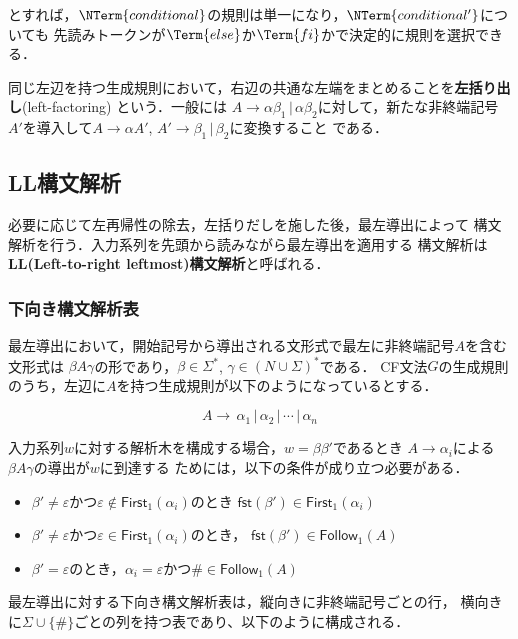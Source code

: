 \documentclass[a4j,dvipdfmx]{jbook}
\begin{document}
とすれば，$\NTerm{conditional}$の規則は単一になり，$\NTerm{conditional'}$についても
先読みトークンが$\Term{else}$か$\Term{fi}$かで決定的に規則を選択できる．

同じ左辺を持つ生成規則において，右辺の共通な左端をまとめることを{\bf 左括り出し}(left-factoring)
という．一般には $A\rightarrow \alpha\beta_1\,|\,\alpha\beta_2$に対して，新たな非終端記号
$A'$を導入して$A\rightarrow \alpha A'$, $A'\rightarrow\beta_1\,|\,\beta_2$に変換すること
である．

\subsection{LL構文解析}

必要に応じて左再帰性の除去，左括りだしを施した後，最左導出によって
構文解析を行う．入力系列を先頭から読みながら最左導出を適用する
構文解析は{\bf LL(Left-to-right leftmost)構文解析}と呼ばれる．

\subsubsection{下向き構文解析表}

最左導出において，開始記号から導出される文形式で最左に非終端記号$A$を含む文形式は
$\beta A\gamma$の形であり，$\beta\in\Sigma^\ast$, $\gamma\in(N\cup\Sigma)^\ast$である．
CF文法$G$の生成規則のうち，左辺に$A$を持つ生成規則が以下のようになっているとする．

\[A\rightarrow\,\alpha_1\,|\,\alpha_2\,|\,\cdots\,|\,\alpha_n\]

入力系列$w$に対する解析木を構成する場合，$w=\beta\beta'$であるとき
$A\rightarrow\alpha_i$による$\beta A\gamma$の導出が$w$に到達する
ためには，以下の条件が成り立つ必要がある．

\begin{itemize}
  \item $\beta'\not=\varepsilon$かつ$\varepsilon\notin\mathsf{First}_1(\alpha_i)$のとき
  $\mathsf{fst}(\beta')\in\mathsf{First}_1(\alpha_i)$ 
  \item $\beta'\not=\varepsilon$かつ$\varepsilon\in\mathsf{First}_1(\alpha_i)$のとき，
  $\mathsf{fst}(\beta')\in\mathsf{Follow}_1(A)$
  \item $\beta'=\varepsilon$のとき，$\alpha_i=\varepsilon$かつ$\#\in\mathsf{Follow}_1(A)$
\end{itemize}

最左導出に対する下向き構文解析表は，縦向きに非終端記号ごとの行，
横向きに$\Sigma\cup\{\#\}$ごとの列を持つ表であり、以下のように構成される．
\end{document}
